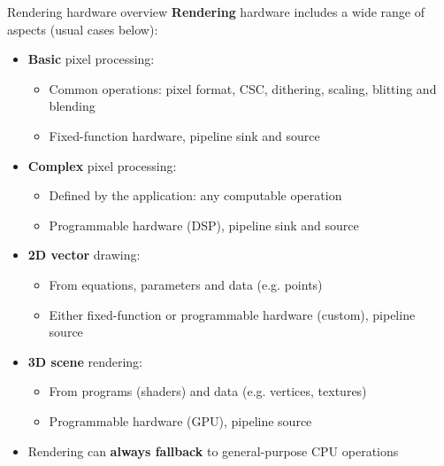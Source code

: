 \begin{frame}{Rendering hardware overview}
  \textbf{Rendering} hardware includes a wide range of aspects (usual cases below):
  \begin{itemize}
  \item \textbf{Basic} pixel processing:
  \begin{itemize}
    \item Common operations: pixel format, CSC, dithering, scaling, blitting and blending
    \item Fixed-function hardware, pipeline sink and source
  \end{itemize}
  \item \textbf{Complex} pixel processing:
  \begin{itemize}
    \item Defined by the application: any computable operation
    \item Programmable hardware (DSP), pipeline sink and source
  \end{itemize}
  \item \textbf{2D vector} drawing:
  \begin{itemize}
    \item From equations, parameters and data (e.g. points)
    \item Either fixed-function or programmable hardware (custom), pipeline source
  \end{itemize}
  \item \textbf{3D scene} rendering:
  \begin{itemize}
    \item From programs (shaders) and data (e.g. vertices, textures)
    \item Programmable hardware (GPU), pipeline source
  \end{itemize}
  \item Rendering can \textbf{always fallback} to general-purpose CPU operations
  \end{itemize}
\end{frame}

